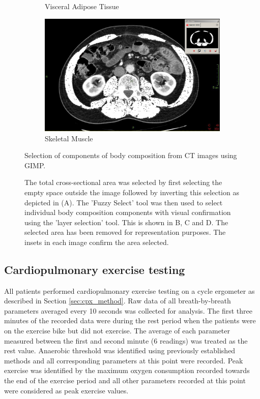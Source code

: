 \begin{figure}[htbp]
\begin{subfigure}{0.45\textwidth}
		\caption{Visceral Adipose Tissue}
		\label{fig:bc_ct_vat}
	\end{subfigure}
	\begin{subfigure}{0.45\textwidth}
		\centering
		\includegraphics[width=\textwidth]{Figures/bc_ct_sm}
		\caption{Skeletal Muscle}
		\label{fig:bc_ct_sm}
	\end{subfigure}
	
	\caption{Selection of components of body composition from CT images using GIMP.}
	\caption*{The total cross-sectional area was selected by first selecting the empty space outside the image followed by inverting this selection as depicted in (A). The 'Fuzzy Select' tool was then used to select individual body composition components with visual confirmation using the 'layer selection' tool. This is shown in B, C and D. The selected area has been removed for representation purposes. The insets in each image confirm the area selected.}
	\label{fig:bc_ct_gimp}
\end{figure}

\subsection{Cardiopulmonary exercise testing}
All patients performed cardiopulmonary exercise testing on a cycle ergometer as described in Section \ref{sec:cpx_method}. 
Raw data of all breath-by-breath parameters averaged every 10 seconds was collected for analysis. 
The first three minutes of the recorded data were during the rest period when the patients were on the exercise bike but did not exercise. 
The average of each parameter measured between the first and second minute (6 readings) was treated as the rest value. 
Anaerobic threshold was identified using previously established methods \parencite{beaver_new_1986,sue_metabolic_1988} and all corresponding parameters at this point were recorded. 
Peak exercise was identified by the maximum oxygen consumption recorded towards the end of the exercise period and all other parameters recorded at this point were considered as peak exercise values.

